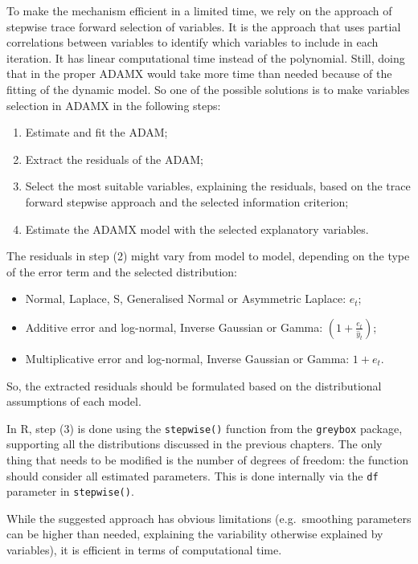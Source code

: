 \documentclass[
]{book}
\providecommand{\tightlist}{%
  \setlength{\itemsep}{0pt}\setlength{\parskip}{0pt}}
\theoremstyle{definition}
\theoremstyle{definition}
\theoremstyle{definition}
\theoremstyle{definition}
\theoremstyle{remark}
\begin{document}
To make the mechanism efficient in a limited time, we rely on the \citet{Sagaert2021} approach of stepwise trace forward selection of variables. It is the approach that uses partial correlations between variables to identify which variables to include in each iteration. It has linear computational time instead of the polynomial. Still, doing that in the proper ADAMX would take more time than needed because of the fitting of the dynamic model. So one of the possible solutions is to make variables selection in ADAMX in the following steps:

\begin{enumerate}
\def\labelenumi{\arabic{enumi}.}
\tightlist
\item
  Estimate and fit the ADAM;
\item
  Extract the residuals of the ADAM;
\item
  Select the most suitable variables, explaining the residuals, based on the trace forward stepwise approach and the selected information criterion;
\item
  Estimate the ADAMX model with the selected explanatory variables.
\end{enumerate}

The residuals in step (2) might vary from model to model, depending on the type of the error term and the selected distribution:

\begin{itemize}
\tightlist
\item
  Normal, Laplace, S, Generalised Normal or Asymmetric Laplace: \(e_t\);
\item
  Additive error and log-normal, Inverse Gaussian or Gamma: \(\left(1+\frac{e_t}{\hat{y}_t} \right)\);
\item
  Multiplicative error and log-normal, Inverse Gaussian or Gamma: \(1+e_t\).
\end{itemize}

So, the extracted residuals should be formulated based on the distributional assumptions of each model.

In R, step (3) is done using the \texttt{stepwise()} function from the \texttt{greybox} package, supporting all the distributions discussed in the previous chapters. The only thing that needs to be modified is the number of degrees of freedom: the function should consider all estimated parameters. This is done internally via the \texttt{df} parameter in \texttt{stepwise()}.

While the suggested approach has obvious limitations (e.g.~smoothing parameters can be higher than needed, explaining the variability otherwise explained by variables), it is efficient in terms of computational time.
\end{document}
